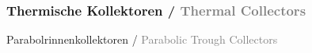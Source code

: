 \documentclass[12pt,a4paper]{article}
\def\gray#1{\textcolor{gray}{#1}}
\def\linebreak{\newline \newline}
\newcommand{\myquad}[1][1]{\hspace*{#1em}\ignorespaces}
\begin{document}
\subsubsection*{Thermische Kollektoren / \gray{Thermal Collectors}}
%
\vspace{0.15cm}
%
Parabolrinnenkollektoren / \gray{Parabolic Trough Collectors}
%
\linebreak
\end{document}
